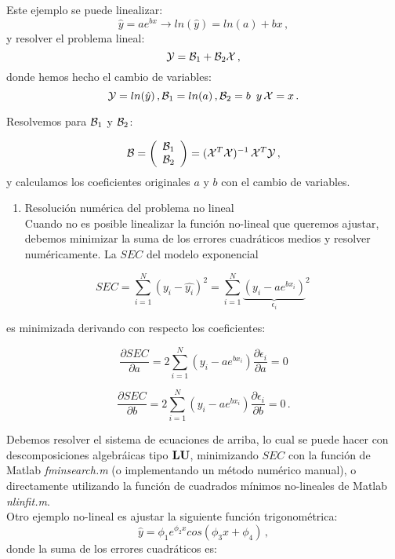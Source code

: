 \documentclass[
]{agujournal2019}
\providecommand{\tightlist}{%
  \setlength{\itemsep}{0pt}\setlength{\parskip}{0pt}}\usepackage{longtable,booktabs,array}
\begin{document}
Este ejemplo se puede linealizar:
\[\hat{y}=a e^{bx}\rightarrow ln(\hat{y})=ln(a) + bx\,,\] y resolver el
problema lineal: \[{\cal Y}={\cal B}_1 + {\cal B}_2 {\cal X}\,,\] donde
hemos hecho el cambio de variables:
\[{\cal Y}=ln(\hat{y})\,,{\cal B}_1=ln(a)\,,{\cal B}_2=b\,\,\,{ y}\,{\cal X}=x\,.\]

Resolvemos para \({\cal B}_1\) y \({\cal B}_2\):

\[{\cal B}=\left(\begin{array}{c}
            {\cal B}_1\\
            {\cal B}_2\\
              \end{array}\right)=({\cal X}^T {\cal X})^{-1}\,{\cal X}^T{\cal Y}
\,,\] y calculamos los coeficientes originales \(a\) y \(b\) con el
cambio de variables.

\vspace{0.5cm}

\begin{enumerate}
\def\labelenumi{\arabic{enumi}.}
\setcounter{enumi}{1}
\tightlist
\item
  Resolución numérica del problema no lineal\\
  Cuando no es posible linealizar la función no-lineal que queremos
  ajustar, debemos minimizar la suma de los errores cuadráticos medios y
  resolver numéricamente. La \(SEC\) del modelo exponencial
\end{enumerate}

\[SEC=\sum\limits^N_{i=1}(y_i-\hat{y_i})^2=\sum\limits^N_{i=1}
              {\underbrace{\left(y_i - a e^{bx_i}\right)}_{\epsilon_i}}^2\,\]

es minimizada derivando con respecto los coeficientes:

\[\frac{\partial{SEC}}{\partial{a}}=
      2\sum\limits^N_{i=1}\left(y_i - a e^{bx_i}\right)\frac{\partial{\epsilon_i}}{\partial{a}}=0\]

\[\frac{\partial{SEC}}{\partial{b}}=
2\sum\limits^N_{i=1}\left(y_i - a e^{bx_i}\right)\frac{\partial{\epsilon_i}}{\partial{b}}=0\,.\]

Debemos resolver el sistema de ecuaciones de arriba, lo cual se puede
hacer con descomposiciones algebráicas tipo \({\textbf L}{\textbf U}\),
minimizando \(SEC\) con la función de Matlab \emph{fminsearch.m} (o
implementando un método numérico manual), o directamente utilizando la
función de cuadrados mínimos no-lineales de Matlab \emph{nlinfit.m}.\\
Otro ejemplo no-lineal es ajustar la siguiente función trigonométrica:
\[\hat{y}=\phi_1 e^{\phi_2 x} cos(\phi_3 x + \phi_4)\,,\] donde la suma
de los errores cuadráticos es:
\end{document}
